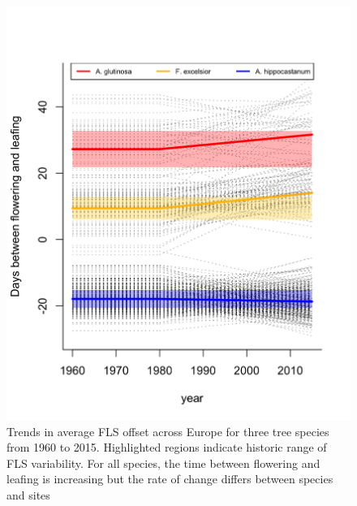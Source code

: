 \documentclass[12pt]{article}\usepackage[]{graphicx}\usepackage[]{color}
\begin{document}
\begin{figure}[ht]
    \centering
 \includegraphics[width=\textwidth]{..//figure/FLS_climate_change.png} 
    \caption{Trends in average FLS offset across Europe for three tree species from 1960 to 2015. Highlighted regions indicate historic range of FLS variability. For all species, the time between flowering and leafing is increasing but the rate of change differs between species and sites}
    \label{fig:Figure 1}
\end{figure}
\end{document}
